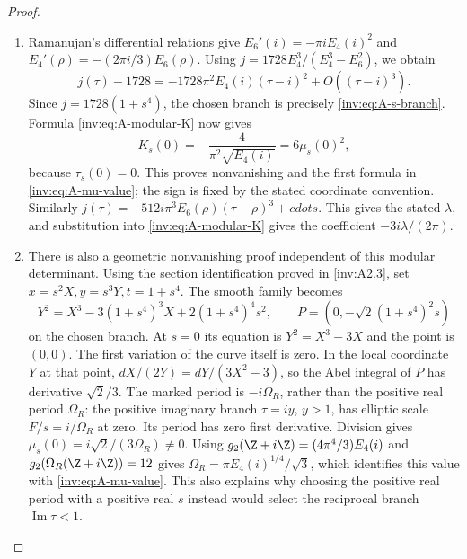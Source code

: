 \begin{proof}
\begin{enumerate}[label=\arabic*.,leftmargin=*]
\item Ramanujan's differential relations give
$E_6'(i)=-\pi i E_4(i)^2$ and
$E_4'(\rho)=-(2\pi i/3)E_6(\rho)$.
Using $j=1728E_4^3/(E_4^3-E_6^2)$, we obtain
\[
j(\tau)-1728=-1728\pi^2E_4(i)(\tau-i)^2+O((\tau-i)^3).
\]
Since $j=1728(1+s^4)$, the chosen branch is precisely
\eqref{inv:eq:A-s-branch}.  Formula \eqref{inv:eq:A-modular-K} now gives
\[
K_s(0)=-\frac4{\pi^2\sqrt{E_4(i)}}=6\mu_s(0)^2,
\]
because $\tau_s(0)=0$.  This proves nonvanishing and the first
formula in \eqref{inv:eq:A-mu-value}; the sign is fixed by the stated
coordinate convention.  Similarly
$j(\tau)=-512i\pi^3E_6(\rho)(\tau-\rho)^3+cdots$.
This gives the stated $\lambda$, and substitution into
\eqref{inv:eq:A-modular-K} gives the coefficient $-3i\lambda/(2\pi)$.

\item There is also a geometric nonvanishing proof independent of this
modular determinant.  Using the section identification proved in
\ref{inv:A2.3}, set $x=s^2X,y=s^3Y,t=1+s^4$.  The smooth family becomes
\[
Y^2=X^3-3(1+s^4)^3X+2(1+s^4)^4s^2,
\qquad P=(0,-\sqrt2(1+s^4)^2s)
\]
on the chosen branch.  At $s=0$ its equation is
$Y^2=X^3-3X$ and the point is $(0,0)$.  The first variation of the
curve itself is zero.  In the local coordinate $Y$ at that point,
$dX/(2Y)=dY/(3X^2-3)$, so the Abel integral of $P$ has derivative
$\sqrt2/3$.  The marked period is $-i\Omega_R$, rather than the
positive real period $\Omega_R$: the positive imaginary branch
$\tau=iy$, $y>1$, has elliptic scale $F/s=i/\Omega_R$ at zero.
Its period has zero first derivative.  Division gives
$\mu_s(0)=i\sqrt2/(3\Omega_R)\ne0$.
Using $g_2(\Z+i\Z)=(4\pi^4/3)E_4(i)$ and
$g_2(\Omega_R(\Z+i\Z))=12$ gives
$\Omega_R=\pi E_4(i)^{1/4}/\sqrt3$, which identifies this value
with \eqref{inv:eq:A-mu-value}.  This also explains why choosing the
positive real period with a positive real $s$ instead would select
the reciprocal branch $\operatorname{Im}\tau<1$.


\end{enumerate}
\end{proof}
